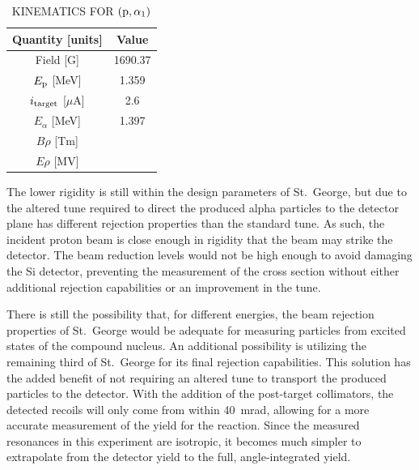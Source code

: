 \begin{table}
    \begin{center}
        \caption{KINEMATICS FOR $({\rm p},\alpha_1)$}
        \label{tab:alpha-one}
        \begin{tabular}{cc}
            \toprule
            \midrule
            \textbf{Quantity [units]} & \textbf{Value} \\
            \midrule
                Field [G]                   & 1690.37 \\
                $E_{\rm p}$ [MeV]           & 1.359 \\
                $i_{\rm target}$ [$\mu$A]   & 2.6 \\
                $E_{\alpha}$ [MeV]          & 1.397 \\
                $B\rho$ [Tm]                & \\
                $E\rho$ [MV]                & \\
            \bottomrule
        \end{tabular}
    \end{center}
\end{table}

The lower rigidity is still within the design parameters of St.\ George,
but due to the altered tune required to direct the produced alpha
particles to the detector plane has different rejection properties than
the standard tune. As such, the incident proton beam is close enough in
rigidity that the beam may strike the detector. The beam reduction
levels would not be high enough to avoid damaging the Si detector,
preventing the measurement of the cross section without either
additional rejection capabilities or an improvement in the tune.

There is still the possibility that, for different energies, the beam
rejection properties of St.\ George would be adequate for measuring
particles from excited states of the compound nucleus. An additional
possibility is utilizing the remaining third of St.\ George for its
final rejection capabilities. This solution has the added benefit of not
requiring an altered tune to transport the produced particles to the
detector. With the addition of the post-target collimators, the detected
recoils will only come from within 40~mrad, allowing for a more accurate
measurement of the yield for the reaction. Since the measured resonances
in this experiment are isotropic, it becomes much simpler to extrapolate
from the detector yield to the full, angle-integrated yield.


